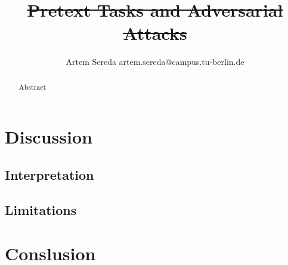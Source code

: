 \documentclass[12pt]{extarticle}
\title{\st{Pretext Tasks and Adversarial Attacks}}
\author{Artem Sereda artem.sereda@campus.tu-berlin.de}
\begin{document}
\maketitle

\begin{abstract}
\normalsize
Abstract
\end{abstract}

\newpage

\newpage




\section{Discussion}
\subsection{Interpretation}
\subsection{Limitations}
\section{Conslusion}




\printbibliography
\end{document}
